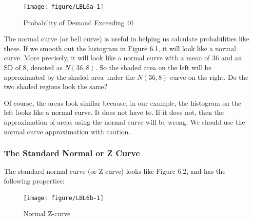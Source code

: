 \documentclass[11pt, chapterprefix=true]{scrbook}\usepackage[]{graphicx}\usepackage[]{color}
\begin{document}
\begin{figure}[ht]
\caption{Probability of Demand Exceeding 40}



{\centering \texttt{[image: figure/LBL6a-1]} 

}



\end{figure}

The normal curve (or bell curve) is useful in helping us calculate probabilities like these.  If we smooth out the histogram in Figure 6.1, it will look like a normal curve.  More precisely, it will look like a normal curve with a mean of 36 and an SD of 8, denoted as $N(36, 8)$.  So the shaded area on the left will be approximated by the shaded area under the $N(36, 8)$ curve on the right.  Do the two shaded regions look the same?

Of course, the areas look similar because, in our example, the histogram on the left looks like a normal curve.  It does not have to.  If it does not, then the approximation of areas using the normal curve will be wrong.  We should use the normal curve approximation with caution.

\subsubsection{The Standard Normal or Z Curve}

The standard normal curve (or Z-curve) looks like Figure 6.2, and has the following properties:

\begin{center}
\end{center}

\begin{figure}[ht]
\caption{Normal Z-curve}



{\centering \texttt{[image: figure/LBL6b-1]} 

}



\end{figure}
\end{document}
